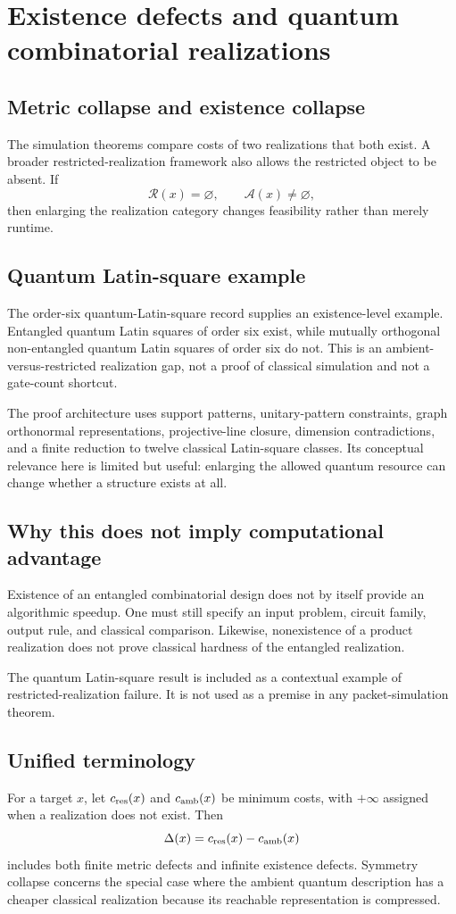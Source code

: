 \chapter{Existence defects and quantum combinatorial realizations}
\label{ch:existence-defects}

\section{Metric collapse and existence collapse}
The simulation theorems compare costs of two realizations that both exist. A broader restricted-realization framework also allows the restricted object to be absent. If
\[
\mathcal R(x)=\varnothing,
\qquad
\mathcal A(x)\neq\varnothing,
\]
then enlarging the realization category changes feasibility rather than merely runtime.

\section{Quantum Latin-square example}
The order-six quantum-Latin-square record supplies an existence-level example. Entangled quantum Latin squares of order six exist, while mutually orthogonal non-entangled quantum Latin squares of order six do not. This is an ambient-versus-restricted realization gap, not a proof of classical simulation and not a gate-count shortcut.

The proof architecture uses support patterns, unitary-pattern constraints, graph orthonormal representations, projective-line closure, dimension contradictions, and a finite reduction to twelve classical Latin-square classes. Its conceptual relevance here is limited but useful: enlarging the allowed quantum resource can change whether a structure exists at all.

\section{Why this does not imply computational advantage}
Existence of an entangled combinatorial design does not by itself provide an algorithmic speedup. One must still specify an input problem, circuit family, output rule, and classical comparison. Likewise, nonexistence of a product realization does not prove classical hardness of the entangled realization.

\begin{scopebox}
The quantum Latin-square result is included as a contextual example of restricted-realization failure. It is not used as a premise in any packet-simulation theorem.
\end{scopebox}

\section{Unified terminology}
For a target $x$, let $c_{\rm res}(x)$ and $c_{\rm amb}(x)$ be minimum costs, with $+\infty$ assigned when a realization does not exist. Then
\[
\Delta(x)
=
c_{\rm res}(x)-c_{\rm amb}(x)
\]
includes both finite metric defects and infinite existence defects. Symmetry collapse concerns the special case where the ambient quantum description has a cheaper classical realization because its reachable representation is compressed.
